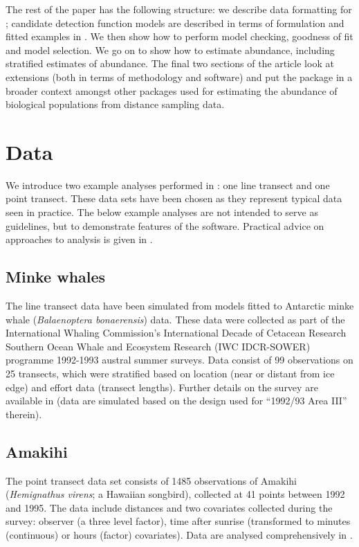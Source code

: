 \documentclass[article]{jss}\usepackage[]{graphicx}\usepackage[]{color}
\begin{document}
The rest of the paper has the following structure: we describe data formatting for ; candidate detection function models are described in terms of formulation and fitted examples in . We then show how to perform model checking, goodness of fit and model selection. We go on to show how to estimate abundance, including stratified estimates of abundance. The final two sections of the article look at extensions (both in terms of methodology and software) and put the package in a broader context amongst other  packages used for estimating the abundance of biological populations from distance sampling data.

\section{Data}

We introduce two example analyses performed in : one line transect and one point transect. These data sets have been chosen as they represent typical data seen in practice. The below example analyses are not intended to serve as guidelines, but to demonstrate features of the software. Practical advice on approaches to analysis is given in \cite{Thomas:2010cf}.

\subsection{Minke whales}

The line transect data have been simulated from models fitted to Antarctic minke whale (\textit{Balaenoptera bonaerensis}) data. These data were collected as part of the International Whaling Commission's International Decade of Cetacean Research Southern Ocean Whale and Ecosystem Research (IWC IDCR-SOWER) programme 1992-1993 austral summer surveys. Data consist of 99 observations on 25 transects, which were stratified based on location (near or distant from ice edge) and effort data (transect lengths). Further details on the survey are available in \cite{Branch:2001ua} (data are simulated based on the design used for ``1992/93 Area III'' therein).

\subsection{Amakihi}

The point transect data set consists of 1485 observations of Amakihi (\textit{Hemignathus virens}; a Hawaiian songbird), collected at 41 points between 1992 and 1995. The data include distances and two covariates collected during the survey: observer (a three level factor), time after sunrise (transformed to minutes (continuous) or hours (factor) covariates). Data are analysed comprehensively in \cite{Marques:2007ey}.
\end{document}
